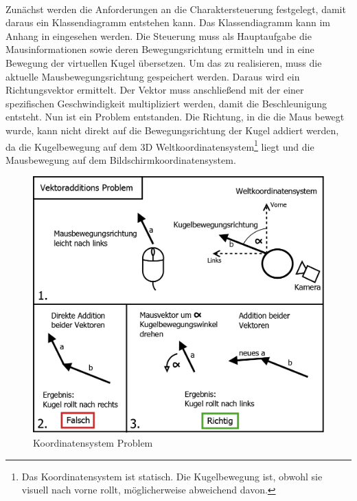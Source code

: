\paragraph{}
Zunächst werden die Anforderungen an die Charaktersteuerung festgelegt, damit daraus ein Klassendiagramm entstehen kann. Das Klassendiagramm kann im Anhang in  eingesehen werden. Die Steuerung muss als Hauptaufgabe die Mausinformationen sowie deren Bewegungsrichtung ermitteln und in eine Bewegung der virtuellen Kugel übersetzen. Um das zu realisieren, muss die aktuelle Mausbewegungsrichtung gespeichert werden. Daraus wird ein Richtungsvektor ermittelt. Der Vektor muss anschließend mit der einer spezifischen Geschwindigkeit multipliziert werden, damit die Beschleunigung entsteht. Nun ist ein Problem entstanden. Die Richtung, in die die Maus bewegt wurde, kann nicht direkt auf die Bewegungsrichtung der Kugel addiert werden, da die Kugelbewegung auf dem 3D Weltkoordinatensystem\footnote{Das Koordinatensystem ist statisch. Die Kugelbewegung ist, obwohl sie visuell nach vorne rollt, möglicherweise abweichend davon.} liegt und die Mausbewegung auf dem Bildschirmkoordinatensystem.

\begin{figure}
\begin{center}
\includegraphics[scale=0.28]{Bilder/Diagramme/KoordinatensystemProblem.png}
\end{center}
\begin{footnotesize}
\caption{Koordinatensystem Problem}
\label{Abb:KoordinatensystemProblem}
\end{footnotesize}
\end{figure}

